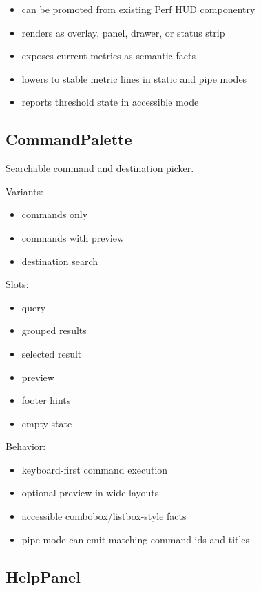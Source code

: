 \begin{itemize}
\tightlist
\item
  can be promoted from existing Perf HUD componentry
\item
  renders as overlay, panel, drawer, or status strip
\item
  exposes current metrics as semantic facts
\item
  lowers to stable metric lines in static and pipe modes
\item
  reports threshold state in accessible mode
\end{itemize}

\subsection{CommandPalette}\label{record-128-commandpalette}

Searchable command and destination picker.

Variants:

\begin{itemize}
\tightlist
\item
  commands only
\item
  commands with preview
\item
  destination search
\end{itemize}

Slots:

\begin{itemize}
\tightlist
\item
  query
\item
  grouped results
\item
  selected result
\item
  preview
\item
  footer hints
\item
  empty state
\end{itemize}

Behavior:

\begin{itemize}
\tightlist
\item
  keyboard-first command execution
\item
  optional preview in wide layouts
\item
  accessible combobox/listbox-style facts
\item
  pipe mode can emit matching command ids and titles
\end{itemize}

\subsection{HelpPanel}\label{record-128-helppanel}


